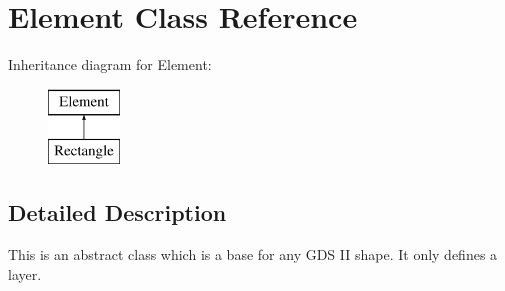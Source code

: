 \hypertarget{class_a_g_d_s_1_1_element}{\section{Element Class Reference}
\label{class_a_g_d_s_1_1_element}
}
Inheritance diagram for Element\-:\begin{figure}[H]
\begin{center}
\leavevmode
\includegraphics[height=2.000000cm]{class_a_g_d_s_1_1_element}
\end{center}
\end{figure}


\subsection{Detailed Description}
This is an abstract class which is a base for any G\-D\-S I\-I shape. It only defines a layer. 